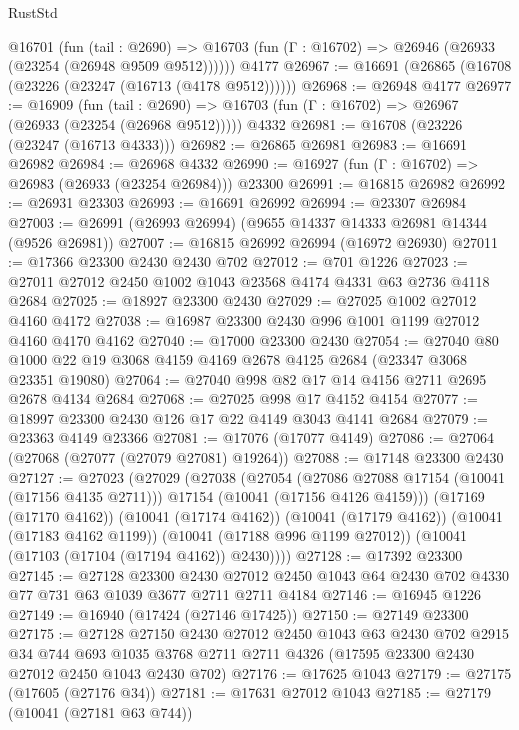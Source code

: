 \begin{lexlean}{RustStd}
\begin{coremodule}
    @16701
      (fun (tail : @2690) =>
      @16703 (fun (Γ : @16702) => @26946 (@26933 (@23254 (@26948 @9509 @9512))))))
    @4177
@26967 := @16691 (@26865 (@16708 (@23226 (@23247 (@16713 (@4178 @9512))))))
@26968 := @26948 @4177
@26977 := @16909
    (fun (tail : @2690) => @16703 (fun (Γ : @16702) => @26967 (@26933 (@23254 (@26968 @9512)))))
    @4332
@26981 := @16708 (@23226 (@23247 (@16713 @4333)))
@26982 := @26865 @26981
@26983 := @16691 @26982
@26984 := @26968 @4332
@26990 := @16927 (fun (Γ : @16702) => @26983 (@26933 (@23254 @26984))) @23300
@26991 := @16815 @26982
@26992 := @26931 @23303
@26993 := @16691 @26992
@26994 := @23307 @26984
@27003 := @26991 (@26993 @26994) (@9655 @14337 @14333 @26981 @14344 (@9526 @26981))
@27007 := @16815 @26992 @26994 (@16972 @26930)
@27011 := @17366 @23300 @2430 @2430 @702
@27012 := @701 @1226
@27023 := @27011 @27012 @2450 @1002 @1043 @23568 @4174 @4331 @63 @2736 @4118 @2684
@27025 := @18927 @23300 @2430
@27029 := @27025 @1002 @27012 @4160 @4172
@27038 := @16987 @23300 @2430 @996 @1001 @1199 @27012 @4160 @4170 @4162
@27040 := @17000 @23300 @2430
@27054 := @27040 @80 @1000 @22 @19 @3068 @4159 @4169 @2678 @4125 @2684 (@23347 @3068 @23351 @19080)
@27064 := @27040 @998 @82 @17 @14 @4156 @2711 @2695 @2678 @4134 @2684
@27068 := @27025 @998 @17 @4152 @4154
@27077 := @18997 @23300 @2430 @126 @17 @22 @4149 @3043 @4141 @2684
@27079 := @23363 @4149 @23366
@27081 := @17076 (@17077 @4149)
@27086 := @27064 (@27068 (@27077 (@27079 @27081) @19264))
@27088 := @17148 @23300 @2430
@27127 := @27023
    (@27029
      (@27038
        (@27054
          (@27086 @27088 @17154 (@10041 (@17156 @4135 @2711)))
          @17154
          (@10041 (@17156 @4126 @4159)))
        (@17169 (@17170 @4162))
        (@10041 (@17174 @4162))
        (@10041 (@17179 @4162))
        (@10041 (@17183 @4162 @1199))
        (@10041 (@17188 @996 @1199 @27012))
        (@10041 (@17103 (@17104 (@17194 @4162)) @2430))))
@27128 := @17392 @23300
@27145 := @27128
    @23300
    @2430
    @27012
    @2450
    @1043
    @64
    @2430
    @702
    @4330
    @77
    @731
    @63
    @1039
    @3677
    @2711
    @2711
    @4184
@27146 := @16945 @1226
@27149 := @16940 (@17424 (@27146 @17425))
@27150 := @27149 @23300
@27175 := @27128
    @27150
    @2430
    @27012
    @2450
    @1043
    @63
    @2430
    @702
    @2915
    @34
    @744
    @693
    @1035
    @3768
    @2711
    @2711
    @4326
    (@17595 @23300 @2430 @27012 @2450 @1043 @2430 @702)
@27176 := @17625 @1043
@27179 := @27175 (@17605 (@27176 @34))
@27181 := @17631 @27012 @1043
@27185 := @27179 (@10041 (@27181 @63 @744))

\end{coremodule}
\end{lexlean}
